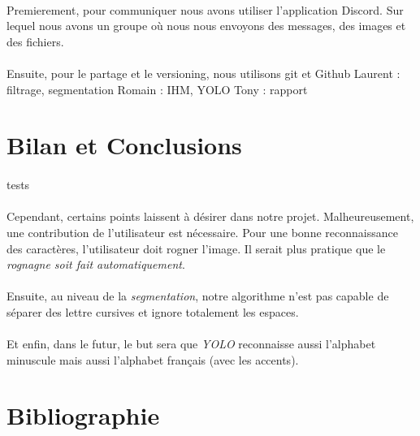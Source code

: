 \documentclass[a4paper]{article}
\begin{document}
		\paragraph{} Premierement, pour communiquer nous avons utiliser l'application Discord. Sur lequel nous avons un groupe où nous nous envoyons des messages, des images et des fichiers.
		\paragraph{} Ensuite, pour le partage et le versioning, nous utilisons git et Github
		Laurent : filtrage, segmentation
		Romain : IHM, YOLO
		Tony : rapport
	\section*{Bilan et Conclusions}%
		\paragraph{}
			tests
		\paragraph{}
			Cependant, certains points laissent à désirer dans notre projet. Malheureusement, une contribution de l'utilisateur est nécessaire. Pour une bonne reconnaissance des caractères, l'utilisateur doit rogner l'image. Il serait plus pratique que le \emph{rognagne soit fait automatiquement}. 
		\paragraph{}
			Ensuite, au niveau de la \emph{segmentation}, notre algorithme n'est pas capable de séparer des lettre cursives et ignore totalement les espaces.
		\paragraph{}
			Et enfin, dans le futur, le but sera que \emph{YOLO} reconnaisse aussi l'alphabet minuscule mais aussi l'alphabet français (avec les accents).
	\newpage
	\section*{Bibliographie}
	\newpage
\end{document}
